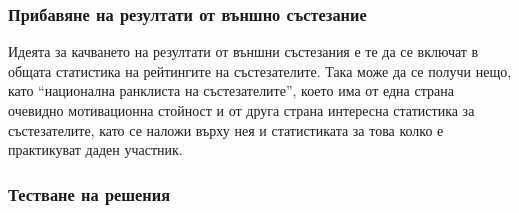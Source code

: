 \documentclass[a4paper,12pt]{article}
\begin{document}
  \subsubsection{Прибавяне на резултати от външно състезание}
  
  Идеята за качването на резултати от външни състезания е те да се включат в общата статистика на рейтингите на състезателите. Така може да се получи нещо, като ``национална ранклиста на състезателите'', което има от една страна очевидно мотивационна стойност и от друга страна интересна статистика за състезателите, като се наложи върху нея и статистиката за това колко е практикуват даден участник.
  
  \subsubsection{Тестване на решения}
  
  \newpage
  
\end{document}
